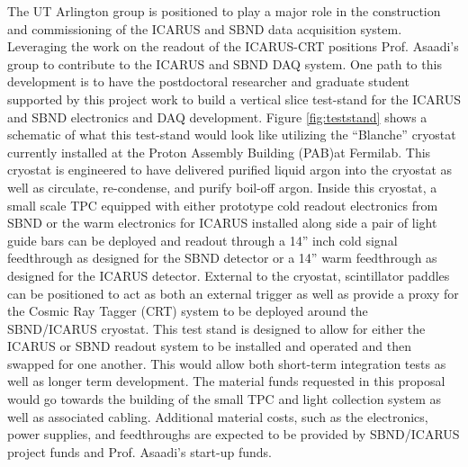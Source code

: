 The UT Arlington group is positioned to play a major role in the construction and commissioning of the ICARUS and SBND data acquisition system. Leveraging the work on the readout of the ICARUS-CRT positions Prof. Asaadi's group to contribute to the ICARUS and SBND DAQ system. One path to this development is to have the postdoctoral researcher and graduate student supported by this project work to build a vertical slice test-stand for the ICARUS and SBND electronics and DAQ development. Figure \ref{fig:teststand} shows a schematic of what this test-stand would look like utilizing the ``Blanche'' cryostat currently installed at the Proton Assembly Building (PAB)at Fermilab. This cryostat is engineered to have delivered purified liquid argon into the cryostat as well as circulate, re-condense, and purify boil-off argon. Inside this cryostat, a small scale TPC equipped with either prototype cold readout electronics from SBND or the warm electronics for ICARUS installed along side a pair of light guide bars can be deployed and readout through a 14'' inch cold signal feedthrough as designed for the SBND detector or a 14'' warm feedthrough as designed for the ICARUS detector. External to the cryostat, scintillator paddles can be positioned to act as both an external trigger as well as provide a proxy for the Cosmic Ray Tagger (CRT) system to be deployed around the SBND/ICARUS cryostat. This test stand is designed to allow for either the ICARUS or SBND readout system to be installed and operated and then swapped for one another. This would allow both short-term integration tests as well as longer term development. The material funds requested in this proposal would go towards the building of the small TPC and light collection system as well as associated cabling. Additional material costs, such as the electronics, power supplies, and feedthroughs are expected to be provided by SBND/ICARUS project funds and Prof. Asaadi's start-up funds.

